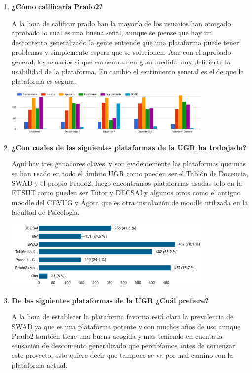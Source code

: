 \begin{enumerate}
\begin{figure}[H]
\end{figure}

  \item \textbf{¿Cómo calificaría Prado2?}


A la hora de calificar prado han la mayoría de los usuarios han otorgado aprobado lo cual es una buena señal, aunque se piense que hay un descontento generalizado la gente entiende que una plataforma puede tener problemas y simplemente espera que se solucionen. Aun con el aprobado general, los usuarios si que encuentran en gran medida muy deficiente la usabilidad de la plataforma. En cambio el sentimiento general es el de que la plataforma es segura.

\includegraphics[width=0.8\textwidth]{../charts/06_calificaria}


  \item \textbf{¿Con cuales de las siguientes plataformas de la UGR ha trabajado?}

Aquí hay tres ganadores claves, y son evidentemente las plataformas que mas se han usado en todo el ámbito UGR como pueden ser el Tablón de Docencia, SWAD y el propio Prado2, luego encontramos plataformas usadas solo en la ETSIIT como pueden ser Tutor y DECSAI y algunos otros como el antiguo moodle del CEVUG y Ágora que es otra instalación de moodle utilizada en la facultad de Psicología.

\includegraphics[width=0.8\textwidth]{../charts/07_plataformastrabajado}

  \item \textbf{De las siguientes plataformas de la UGR ¿Cuál prefiere?}

A la hora de establecer la plataforma favorita está clara la prevalencia de SWAD ya que es una plataforma potente y con muchos años de uso aunque Prado2 también tiene una buena acogida y mas teniendo en cuenta la sensación de descontento generalizado que percibíamos antes de comenzar este proyecto, esto quiere decir que tampoco se va por mal camino con la plataforma actual. 


\end{enumerate}
